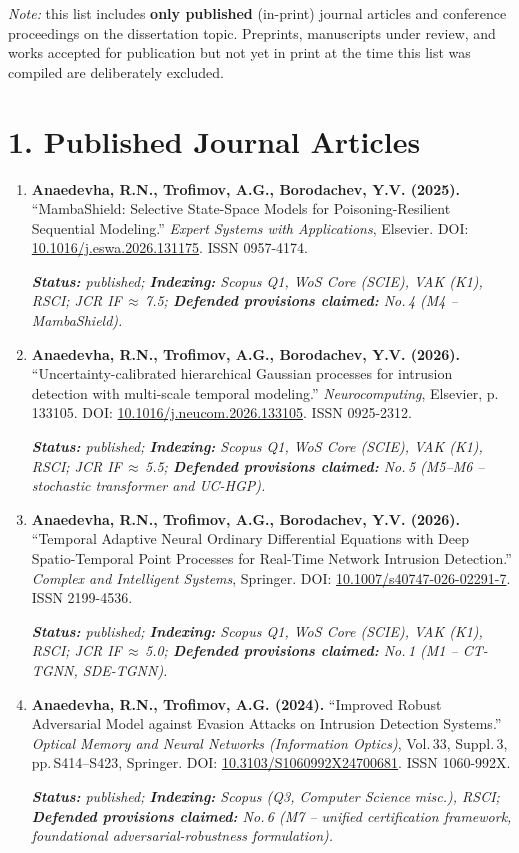 \documentclass[11pt,a4paper]{article}
\newcommand{\pubmeta}[3]{%
  \par\smallskip\textit{\small\textbf{Status:} #1; \textbf{Indexing:} #2; \textbf{Defended provisions claimed:} #3.}\par}
\begin{document}
\vspace{-0.2cm}

\textit{Note:} this list includes \textbf{only published} (in-print) journal articles and conference proceedings on the dissertation topic. Preprints, manuscripts under review, and works accepted for publication but not yet in print at the time this list was compiled are deliberately excluded.

\vspace{-0.2cm}

\section*{1. Published Journal Articles}

\begin{enumerate}[leftmargin=*, itemsep=0.3em]

\item \textbf{Anaedevha, R.N., Trofimov, A.G., Borodachev, Y.V. (2025).} ``MambaShield: Selective State-Space Models for Poisoning-Resilient Sequential Modeling.'' \textit{Expert Systems with Applications}, Elsevier. DOI: \href{https://doi.org/10.1016/j.eswa.2026.131175}{10.1016/j.eswa.2026.131175}. ISSN 0957-4174.
\pubmeta{published}{Scopus Q1, WoS Core (SCIE), VAK (K1), RSCI; JCR IF\,$\approx$\,7.5}{No.\,4 (M4 -- MambaShield)}

\item \textbf{Anaedevha, R.N., Trofimov, A.G., Borodachev, Y.V. (2026).} ``Uncertainty-calibrated hierarchical Gaussian processes for intrusion detection with multi-scale temporal modeling.'' \textit{Neurocomputing}, Elsevier, p.\,133105. DOI: \href{https://doi.org/10.1016/j.neucom.2026.133105}{10.1016/j.neucom.2026.133105}. ISSN 0925-2312.
\pubmeta{published}{Scopus Q1, WoS Core (SCIE), VAK (K1), RSCI; JCR IF\,$\approx$\,5.5}{No.\,5 (M5--M6 -- stochastic transformer and UC-HGP)}

\item \textbf{Anaedevha, R.N., Trofimov, A.G., Borodachev, Y.V. (2026).} ``Temporal Adaptive Neural Ordinary Differential Equations with Deep Spatio-Temporal Point Processes for Real-Time Network Intrusion Detection.'' \textit{Complex and Intelligent Systems}, Springer. DOI: \href{https://doi.org/10.1007/s40747-026-02291-7}{10.1007/s40747-026-02291-7}. ISSN 2199-4536.
\pubmeta{published}{Scopus Q1, WoS Core (SCIE), VAK (K1), RSCI; JCR IF\,$\approx$\,5.0}{No.\,1 (M1 -- CT-TGNN, SDE-TGNN)}

\item \textbf{Anaedevha, R.N., Trofimov, A.G. (2024).} ``Improved Robust Adversarial Model against Evasion Attacks on Intrusion Detection Systems.'' \textit{Optical Memory and Neural Networks (Information Optics)}, Vol.\,33, Suppl.\,3, pp.\,S414--S423, Springer. DOI: \href{https://doi.org/10.3103/S1060992X24700681}{10.3103/S1060992X24700681}. ISSN 1060-992X.
\pubmeta{published}{Scopus (Q3, Computer Science misc.), RSCI}{No.\,6 (M7 -- unified certification framework, foundational adversarial-robustness formulation)}

\end{enumerate}
\end{document}
